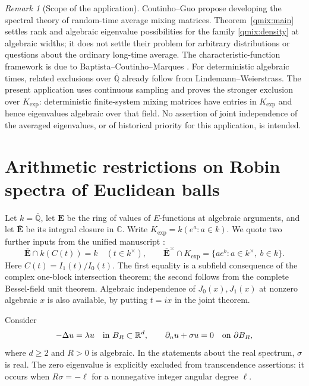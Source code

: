 \documentclass[11pt]{article}
\theoremstyle{definition}
\theoremstyle{remark}
\newtheorem{remark}[theorem]{Remark}
\newcommand{\Qa}{\overline{\mathbb Q}}
\newcommand{\Kexp}{K_{\mathrm{exp}}}
\begin{document}
\begin{remark}[Scope of the application]
\label{qmix:scope}
Coutinho--Guo \cite[Open Problem~4.6]{CG2024} propose developing
the spectral theory of random-time average mixing matrices.
Theorem~\ref{qmix:main} settles rank and algebraic eigenvalue
possibilities for the family \eqref{qmix:density} at algebraic widths;
it does not settle their problem for arbitrary distributions or
questions about the ordinary long-time average.
The characteristic-function framework is due to
Baptista--Coutinho--Marques \cite{BCM2024}.
For deterministic algebraic times, related exclusions over $\Qa$
already follow from Lindemann--Weierstrass. The present application
uses continuous sampling and proves the stronger exclusion over
$\Kexp$: deterministic finite-system mixing matrices have entries
in $\Kexp$ and hence eigenvalues algebraic over that field.
No assertion of joint independence of the averaged eigenvalues,
or of historical priority for this application, is intended.
\end{remark}

\section{Arithmetic restrictions on Robin spectra of Euclidean balls}
\label{sp:section}

Let $k=\overline{\mathbb Q}$, let $\mathbf E$ be the ring of values of
$E$-functions at algebraic arguments, and let $\overline{\mathbf E}$ be
its integral closure in $\mathbb C$.  Write
$K_{\exp}=k(e^a:a\in k)$.  We quote two further inputs from the unified
manuscript \cite[Theorems 22.2 and 34.2]{Unified}:
\begin{equation}\label{sp:inputs}
 \overline{\mathbf E}\cap k(C(t))=k\quad(t\in k^\times),\qquad
 \overline{\mathbf E}^{\times}\cap K_{\exp}
       =\{a e^b:a\in k^\times,\ b\in k\}.
\end{equation}
Here $C(t)=I_1(t)/I_0(t)$.  The first equality is a subfield consequence
of the complex one-block intersection theorem; the second follows from
the complete Bessel-field unit theorem.  Algebraic independence of
$J_0(x),J_1(x)$ at nonzero algebraic $x$ is also available, by putting
$t=ix$ in the joint theorem.

Consider
\begin{equation}\label{sp:robin}
 -\Delta u=\lambda u\quad\hbox{in }B_R\subset\mathbb R^d,
 \qquad \partial_nu+\sigma u=0\quad\hbox{on }\partial B_R,
\end{equation}
where $d\ge2$ and $R>0$ is algebraic.  In the statements about the real
spectrum, $\sigma$ is real.  The zero eigenvalue is explicitly excluded
from transcendence assertions: it occurs when $R\sigma=-\ell$ for a
nonnegative integer angular degree $\ell$.
\end{document}
